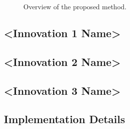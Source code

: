 \documentclass[10pt,twocolumn,letterpaper]{article}
\begin{document}

\begin{figure}[t]
  \centering
  \caption{Overview of the proposed method.}
  \label{fig:architecture}
\end{figure}

\subsection{<Innovation 1 Name>}
\label{sec:method-innov1}


\subsection{<Innovation 2 Name>}
\label{sec:method-innov2}


\subsection{<Innovation 3 Name>}
\label{sec:method-innov3}



\subsection{Implementation Details}
\label{sec:method-impl}


\end{document}
